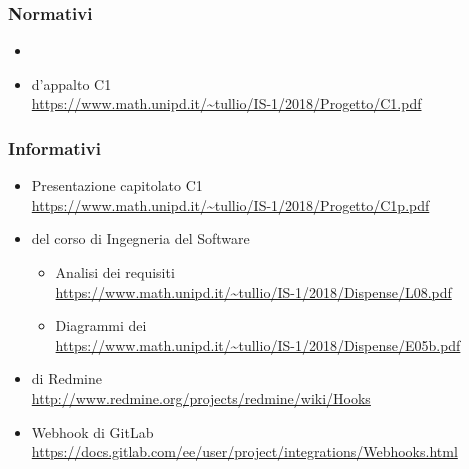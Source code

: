 	\subsubsection{Normativi}
	\begin{itemize}
		\item \Doc{\NdPv}
		\item {} d'appalto C1\\
		\url{https://www.math.unipd.it/~tullio/IS-1/2018/Progetto/C1.pdf}
	\end{itemize}

	\subsubsection{Informativi} \label{sec:RiferimentiInformativi}
	\begin{itemize}
		\item Presentazione capitolato C1\\
		\url{https://www.math.unipd.it/~tullio/IS-1/2018/Progetto/C1p.pdf}
		\item {} del corso di Ingegneria del Software
		\begin{itemize}
			\item Analisi dei requisiti\\
			\url{https://www.math.unipd.it/~tullio/IS-1/2018/Dispense/L08.pdf}
			\item Diagrammi dei \\
			\url{https://www.math.unipd.it/~tullio/IS-1/2018/Dispense/E05b.pdf}
		\end{itemize}
		\item {} di Redmine\\
		\url{http://www.redmine.org/projects/redmine/wiki/Hooks}
		\item Webhook di GitLab\\
		\url{https://docs.gitlab.com/ee/user/project/integrations/Webhooks.html}
	\end{itemize}